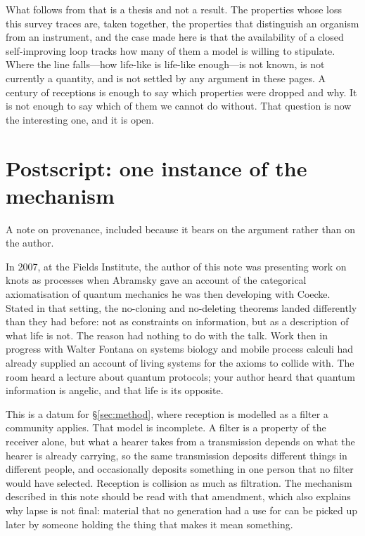 \documentclass[11pt,a4paper]{article}
\begin{document}
What follows from that is a thesis and not a result. The properties whose loss
this survey traces are, taken together, the properties that distinguish an
organism from an instrument, and the case made here is that the availability of
a closed self-improving loop tracks how many of them a model is willing to
stipulate. Where the line falls---how life-like is life-like enough---is not
known, is not currently a quantity, and is not settled by any argument in these
pages. A century of receptions is enough to say which properties were dropped and
why. It is not enough to say which of them we cannot do without. That question is
now the interesting one, and it is open.

\section*{Postscript: one instance of the mechanism}

A note on provenance, included because it bears on the argument rather than on
the author.

In 2007, at the Fields Institute, the author of this note was presenting work on
knots as processes when Abramsky gave an account of the categorical
axiomatisation of quantum mechanics he was then developing with Coecke. Stated in
that setting, the no-cloning and no-deleting theorems landed differently than
they had before: not as constraints on information, but as a description of what
life is not. The reason had nothing to do with the talk. Work then in progress
with Walter Fontana on systems biology and mobile process calculi had already
supplied an account of living systems for the axioms to collide with. The room
heard a lecture about quantum protocols; your author heard that quantum
information is angelic, and that life is its opposite.

This is a datum for \S\ref{sec:method}, where reception is modelled as a filter a
community applies. That model is incomplete. A filter is a property of the
receiver alone, but what a hearer takes from a transmission depends on what the
hearer is already carrying, so the same transmission deposits different things in
different people, and occasionally deposits something in one person that no
filter would have selected. Reception is collision as much as filtration. The
mechanism described in this note should be read with that amendment, which also
explains why lapse is not final: material that no generation had a use for can be
picked up later by someone holding the thing that makes it mean something.
\end{document}
